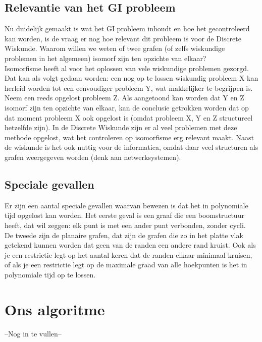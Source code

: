\documentclass{article}
\begin{document}
\subsection{Relevantie van het GI probleem}
Nu duidelijk gemaakt is wat het GI probleem inhoudt en hoe het gecontroleerd kan worden, is de vraag er nog hoe relevant dit probleem is voor de Discrete Wiskunde. Waarom willen we weten of twee grafen (of zelfs wiskundige problemen in het algemeen) isomorf zijn ten opzichte van elkaar?\\

Isomorfisme heeft al voor het oplossen van vele wiskundige problemen gezorgd. Dat kan als volgt gedaan worden: een nog op te lossen wiskundig probleem X kan herleid worden tot een eenvoudiger probleem Y, wat makkelijker te begrijpen is. Neem een reeds opgelost probleem Z. Als aangetoond kan worden dat Y en Z isomorf zijn ten opzichte van elkaar, kan de conclusie getrokken worden dat op dat moment probleem X ook opgelost is (omdat probleem X, Y en Z structureel hetzelfde zijn). In de Discrete Wiskunde zijn er al veel problemen met deze methode opgelost, wat het controleren op isomorfisme erg relevant maakt.
Naast de wiskunde is het ook nuttig voor de informatica, omdat daar veel structuren als grafen weergegeven worden (denk aan netwerksystemen).

\subsection{Speciale gevallen}
Er zijn een aantal speciale gevallen waarvan bewezen is dat het in polynomiale tijd opgelost kan worden. Het eerste geval is een graaf die een boomstructuur heeft, dat wil zeggen: elk punt is met een ander punt verbonden, zonder cycli.\\
De tweede zijn de planaire grafen, dat zijn de grafen die zo in het platte vlak getekend kunnen worden dat geen van de randen een andere rand kruist. Ook als je een restrictie legt op het aantal keren dat de randen elkaar minimaal kruisen, of als je een restrictie legt op de maximale graad van alle hoekpunten is het in polynomiale tijd op te lossen.
\pagebreak


\section{Ons algoritme}
--Nog in te vullen--
\pagebreak
\end{document}
